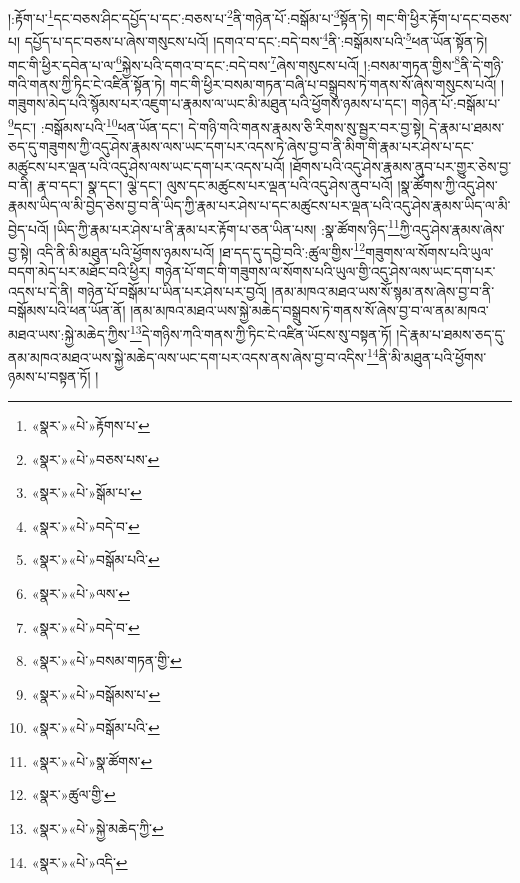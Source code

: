 །:རྟོག་པ་\footnote{«སྣར་»«པེ་»རྟོགས་པ་}དང་བཅས་ཤིང་དཔྱོད་པ་དང་:བཅས་པ་\footnote{«སྣར་»«པེ་»བཅས་པས་}ནི་གཉེན་པོ་:བསྒོམ་པ་\footnote{«སྣར་»«པེ་»སྒོམ་པ་}སྟོན་ཏེ། གང་གི་ཕྱིར་རྟོག་པ་དང་བཅས་པ། དཔྱོད་པ་དང་བཅས་པ་ཞེས་གསུངས་པའོ། །དགའ་བ་དང་:བདེ་བས་\footnote{«སྣར་»«པེ་»བདེ་བ་}ནི་:བསྒོམས་པའི་\footnote{«སྣར་»«པེ་»བསྒོམ་པའི་}ཕན་ཡོན་སྟོན་ཏེ། གང་གི་ཕྱིར་དབེན་པ་ལ་\footnote{«སྣར་»«པེ་»ལས་}སྐྱེས་པའི་དགའ་བ་དང་:བདེ་བས་\footnote{«སྣར་»«པེ་»བདེ་བ་}ཞེས་གསུངས་པའོ། །:བསམ་གཏན་གྱིས་\footnote{«སྣར་»«པེ་»བསམ་གཏན་གྱི་}ནི་དེ་གཉི་གའི་གནས་ཀྱི་ཏིང་ངེ་འཛིན་སྟོན་ཏེ། གང་གི་ཕྱིར་བསམ་གཏན་བཞི་པ་བསྒྲུབས་ཏེ་གནས་སོ་ཞེས་གསུངས་པའོ། །གཟུགས་མེད་པའི་སྙོམས་པར་འཇུག་པ་རྣམས་ལ་ཡང་མི་མཐུན་པའི་ཕྱོགས་ཉམས་པ་དང་། གཉེན་པོ་:བསྒོམ་པ་\footnote{«སྣར་»«པེ་»བསྒོམས་པ་}དང་། :བསྒོམས་པའི་\footnote{«སྣར་»«པེ་»བསྒོམ་པའི་}ཕན་ཡོན་དང་། དེ་གཉི་གའི་གནས་རྣམས་ཅི་རིགས་སུ་སྦྱར་བར་བྱ་སྟེ། དེ་རྣམ་པ་ཐམས་ཅད་དུ་གཟུགས་ཀྱི་འདུ་ཤེས་རྣམས་ལས་ཡང་དག་པར་འདས་ཏེ་ཞེས་བྱ་བ་ནི་མིག་གི་རྣམ་པར་ཤེས་པ་དང་མཚུངས་པར་ལྡན་པའི་འདུ་ཤེས་ལས་ཡང་དག་པར་འདས་པའོ། །ཐོགས་པའི་འདུ་ཤེས་རྣམས་ནུབ་པར་གྱུར་ཅེས་བྱ་བ་ནི། རྣ་བ་དང་། སྣ་དང་། ལྕེ་དང་། ལུས་དང་མཚུངས་པར་ལྡན་པའི་འདུ་ཤེས་ནུབ་པའོ། །སྣ་ཚོགས་ཀྱི་འདུ་ཤེས་རྣམས་ཡིད་ལ་མི་བྱེད་ཅེས་བྱ་བ་ནི་ཡིད་ཀྱི་རྣམ་པར་ཤེས་པ་དང་མཚུངས་པར་ལྡན་པའི་འདུ་ཤེས་རྣམས་ཡིད་ལ་མི་བྱེད་པའོ། །ཡིད་ཀྱི་རྣམ་པར་ཤེས་པ་ནི་རྣམ་པར་རྟོག་པ་ཅན་ཡིན་པས། :སྣ་ཚོགས་ཉིད་\footnote{«སྣར་»«པེ་»སྣ་ཚོགས་}ཀྱི་འདུ་ཤེས་རྣམས་ཞེས་བྱ་སྟེ། འདི་ནི་མི་མཐུན་པའི་ཕྱོགས་ཉམས་པའོ། །ཐ་དད་དུ་དབྱེ་བའི་:ཚུལ་གྱིས་\footnote{«སྣར་»ཚུལ་གྱི་}གཟུགས་ལ་སོགས་པའི་ཡུལ་བདག་མེད་པར་མཐོང་བའི་ཕྱིར། གཉེན་པོ་གང་གི་གཟུགས་ལ་སོགས་པའི་ཡུལ་གྱི་འདུ་ཤེས་ལས་ཡང་དག་པར་འདས་པ་དེ་ནི། གཉེན་པོ་བསྒོམ་པ་ཡིན་པར་ཤེས་པར་བྱའོ། །ནམ་མཁའ་མཐའ་ཡས་སོ་སྙམ་ནས་ཞེས་བྱ་བ་ནི་བསྒོམས་པའི་ཕན་ཡོན་ནོ། །ནམ་མཁའ་མཐའ་ཡས་སྐྱེ་མཆེད་བསྒྲུབས་ཏེ་གནས་སོ་ཞེས་བྱ་བ་ལ་ནམ་མཁའ་མཐའ་ཡས་:སྐྱེ་མཆེད་ཀྱིས་\footnote{«སྣར་»«པེ་»སྐྱེ་མཆེད་ཀྱི་}དེ་གཉིས་ཀའི་གནས་ཀྱི་ཏིང་ངེ་འཛིན་ཡོངས་སུ་བསྟན་ཏོ། །དེ་རྣམ་པ་ཐམས་ཅད་དུ་ནམ་མཁའ་མཐའ་ཡས་སྐྱེ་མཆེད་ལས་ཡང་དག་པར་འདས་ནས་ཞེས་བྱ་བ་འདིས་\footnote{«སྣར་»«པེ་»འདི་}ནི་མི་མཐུན་པའི་ཕྱོགས་ཉམས་པ་བསྟན་ཏོ། །
